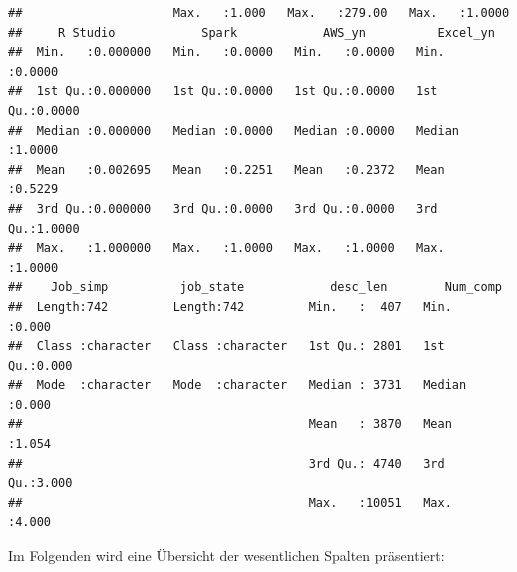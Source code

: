 \documentclass[
]{article}
\begin{document}
\begin{verbatim}
##                     Max.   :1.000   Max.   :279.00   Max.   :1.0000  
##     R Studio            Spark            AWS_yn          Excel_yn     
##  Min.   :0.000000   Min.   :0.0000   Min.   :0.0000   Min.   :0.0000  
##  1st Qu.:0.000000   1st Qu.:0.0000   1st Qu.:0.0000   1st Qu.:0.0000  
##  Median :0.000000   Median :0.0000   Median :0.0000   Median :1.0000  
##  Mean   :0.002695   Mean   :0.2251   Mean   :0.2372   Mean   :0.5229  
##  3rd Qu.:0.000000   3rd Qu.:0.0000   3rd Qu.:0.0000   3rd Qu.:1.0000  
##  Max.   :1.000000   Max.   :1.0000   Max.   :1.0000   Max.   :1.0000  
##    Job_simp          job_state            desc_len        Num_comp    
##  Length:742         Length:742         Min.   :  407   Min.   :0.000  
##  Class :character   Class :character   1st Qu.: 2801   1st Qu.:0.000  
##  Mode  :character   Mode  :character   Median : 3731   Median :0.000  
##                                        Mean   : 3870   Mean   :1.054  
##                                        3rd Qu.: 4740   3rd Qu.:3.000  
##                                        Max.   :10051   Max.   :4.000
\end{verbatim}

Im Folgenden wird eine Übersicht der wesentlichen Spalten präsentiert:
\end{document}

